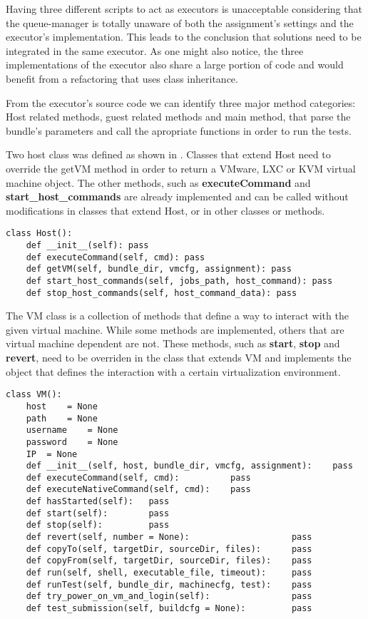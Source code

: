 Having three different scripts to act as executors is unacceptable considering
that the queue-manager is totally unaware of both the assignment's settings
and the executor's implementation. This leads to the conclusion that solutions
need to be integrated in the same executor. As one might also notice, the
three implementations of the executor also share a large portion of code and
would benefit from a refactoring that uses class inheritance.

From the executor's source code we can identify three major method categories:
Host related methods, guest related methods and main method, that parse the
bundle's parameters and call the apropriate functions in order to run the tests.


Two host class was defined as shown in .
Classes that extend Host need to override the getVM method in order to return a
VMware, LXC or KVM virtual machine object. The other methods, such as \textbf{executeCommand}
and \textbf{start_host_commands} are already implemented and can be called
without modifications in classes that extend Host, or in other classes or methods.

\lstset{caption=Generic Host Implementation, language=python, label=lst:generic-host}
\begin{lstlisting}
class Host():
    def __init__(self): pass
    def executeCommand(self, cmd): pass
    def getVM(self, bundle_dir, vmcfg, assignment): pass
    def start_host_commands(self, jobs_path, host_command): pass
    def stop_host_commands(self, host_command_data): pass
\end{lstlisting}


The VM class is a collection of methods that define a way to interact with the
given virtual machine. While some methods are implemented, others that are
virtual machine dependent are not. These methods, such as \textbf{start}, 
\textbf{stop} and \textbf{revert}, need to be overriden in the 
class that extends VM and implements the object that defines the interaction
with a certain virtualization environment.

\lstset{caption=Generic VM Implementation, language=python, label=lst:generic-vm}
\begin{lstlisting}
class VM():
    host 	= None
    path 	= None
    username	= None
    password	= None
    IP	= None
    def __init__(self, host, bundle_dir, vmcfg, assignment):    pass
    def executeCommand(self, cmd):          pass
    def executeNativeCommand(self, cmd):    pass
    def hasStarted(self):   pass
    def start(self):        pass
    def stop(self):         pass
    def revert(self, number = None):                    pass
    def copyTo(self, targetDir, sourceDir, files):      pass
    def copyFrom(self, targetDir, sourceDir, files):    pass
    def run(self, shell, executable_file, timeout):     pass
    def runTest(self, bundle_dir, machinecfg, test):    pass
    def try_power_on_vm_and_login(self):                pass
    def test_submission(self, buildcfg = None):         pass
\end{lstlisting}


